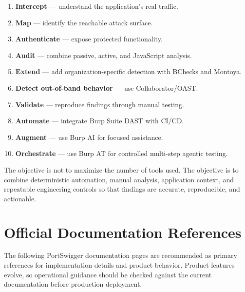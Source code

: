 \documentclass[11pt]{article}
\begin{document}
\begin{enumerate}
  \item \textbf{Intercept} --- understand the application's real traffic.
  \item \textbf{Map} --- identify the reachable attack surface.
  \item \textbf{Authenticate} --- expose protected functionality.
  \item \textbf{Audit} --- combine passive, active, and JavaScript analysis.
  \item \textbf{Extend} --- add organization-specific detection with BChecks and Montoya.
  \item \textbf{Detect out-of-band behavior} --- use Collaborator/OAST.
  \item \textbf{Validate} --- reproduce findings through manual testing.
  \item \textbf{Automate} --- integrate Burp Suite DAST with CI/CD.
  \item \textbf{Augment} --- use Burp AI for focused assistance.
  \item \textbf{Orchestrate} --- use Burp AT for controlled multi-step agentic testing.
\end{enumerate}

\begin{keypointbox}
The objective is not to maximize the number of tools used. The objective is to combine deterministic automation, manual analysis, application context, and repeatable engineering controls so that findings are accurate, reproducible, and actionable.
\end{keypointbox}

\section{Official Documentation References}

The following PortSwigger documentation pages are recommended as primary references for implementation details and product behavior. Product features evolve, so operational guidance should be checked against the current documentation before production deployment.
\end{document}
